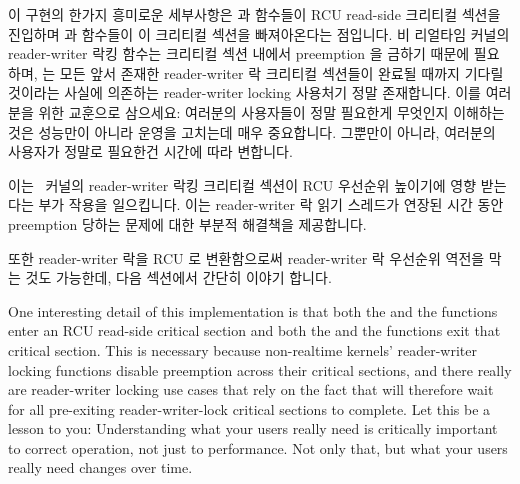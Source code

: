 이 구현의 한가지 흥미로운 세부사항은  과
 함수들이 RCU read-side 크리티컬 섹션을 진입하며
 과  함수들이 이 크리티컬 섹션을
빠져아온다는 점입니다.
비 리얼타임 커널의 reader-writer 락킹 함수는 크리티컬 섹션 내에서 preemption 을
금하기 때문에 필요하며,  는 모든 앞서 존재한
reader-writer 락 크리티컬 섹션들이 완료될 때까지 기다릴 것이라는 사실에
의존하는 reader-writer locking 사용처기 정말 존재합니다.
이를 여러분을 위한 교훈으로 삼으세요:
여러분의 사용자들이 정말 필요한게 무엇인지 이해하는 것은 성능만이 아니라 운영을
고치는데 매우 중요합니다.
그뿐만이 아니라, 여러분의 사용자가 정말로 필요한건 시간에 따라 변합니다.

이는 \rt\ 커널의 reader-writer 락킹 크리티컬 섹션이 RCU 우선순위 높이기에 영향
받는다는 부가 작용을 일으킵니다.
이는 reader-writer 락 읽기 스레드가 연장된 시간 동안 preemption 당하는 문제에
대한 부분적 해결책을 제공합니다.

또한 reader-writer 락을 RCU 로 변환함으로써 reader-writer 락 우선순위 역전을
막는 것도 가능한데, 다음 섹션에서 간단히 이야기 합니다.

\iffalse

One interesting detail of this implementation is that both the
 and the  functions enter an RCU
read-side critical section and both the  and the
 functions exit that critical section.
This is necessary because non-realtime kernels' reader-writer locking
functions disable preemption across their critical sections, and
there really are reader-writer locking use cases that rely on the fact
that  will therefore wait for all pre-exiting
reader-writer-lock critical sections to complete.
Let this be a lesson to you:
Understanding what your users really need is critically important to
correct operation, not just to performance.
Not only that, but what your users really need changes over time.

